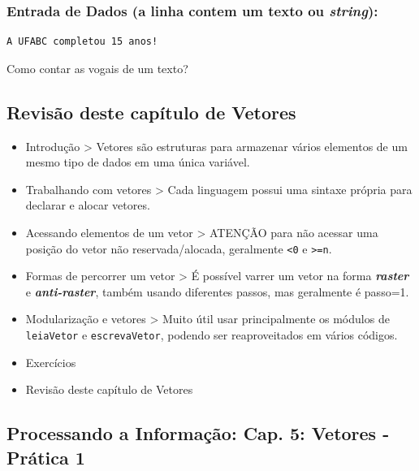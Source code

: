 \documentclass[12pt,a4paper]{article}
\providecommand{\tightlist}{%
      \setlength{\itemsep}{0pt}\setlength{\parskip}{0pt}}
\begin{document}
    \hypertarget{entrada-de-dados-a-linha-contem-um-texto-ou-string}{%
\subsubsection{\texorpdfstring{Entrada de Dados (a linha contem um texto
ou
\emph{string}):}{Entrada de Dados (a linha contem um texto ou string):}}\label{entrada-de-dados-a-linha-contem-um-texto-ou-string}}

\begin{verbatim}
A UFABC completou 15 anos!
\end{verbatim}

Como contar as vogais de um texto?

    \hypertarget{revisuxe3o-deste-capuxedtulo-de-vetores}{%
\subsection{Revisão deste capítulo de
Vetores}\label{revisuxe3o-deste-capuxedtulo-de-vetores}}

\begin{itemize}
\tightlist
\item
  Introdução \textgreater{} Vetores são estruturas para armazenar vários
  elementos de um mesmo tipo de dados em uma única variável.
\item
  Trabalhando com vetores \textgreater{} Cada linguagem possui uma
  sintaxe própria para declarar e alocar vetores.
\item
  Acessando elementos de um vetor \textgreater{} ATENÇÃO para não
  acessar uma posição do vetor não reservada/alocada, geralmente
  \texttt{\textless{}0} e \texttt{\textgreater{}=n}.
\item
  Formas de percorrer um vetor \textgreater{} É possível varrer um vetor
  na forma \textbf{\emph{raster}} e \textbf{\emph{anti-raster}}, também
  usando diferentes passos, mas geralmente é passo=1.
\item
  Modularização e vetores \textgreater{} Muito útil usar principalmente
  os módulos de \texttt{leiaVetor} e \texttt{escrevaVetor}, podendo ser
  reaproveitados em vários códigos.
\item
  Exercícios
\item
  Revisão deste capítulo de Vetores
\end{itemize}

    \hypertarget{processando-a-informauxe7uxe3o-cap.-5-vetores---pruxe1tica-1}{%
\subsection{Processando a Informação: Cap. 5: Vetores - Prática
1}\label{processando-a-informauxe7uxe3o-cap.-5-vetores---pruxe1tica-1}}
\end{document}
